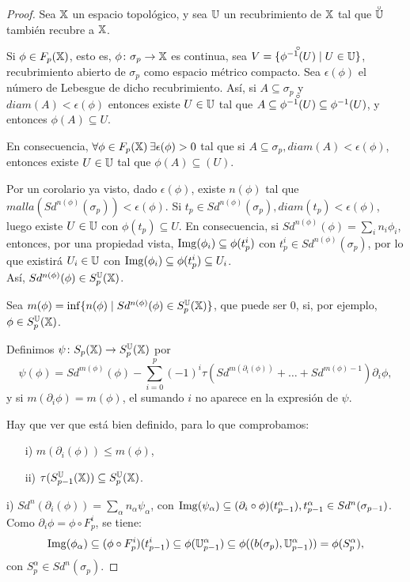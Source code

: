 \begin{proof}
  Sea ${\mathbb X}$ un espacio topológico, y sea ${\mathbb U}$ un recubrimiento de ${\mathbb X}$ tal que $\interior{\U}$ también recubre a ${\mathbb X}$.

  Si $\phi \in F_p({\mathbb X})$, esto es, $\phi \colon \sigma_p \to {\mathbb X}$ es continua, sea $V = \{\interior{\phi^{-1}(U)} \mid U \in \U\}$, recubrimiento
  abierto de $\sigma_p$ como espacio métrico compacto. Sea $\epsilon(\phi)$ el número de Lebesgue de dicho recubrimiento.
  Así, si $A \subseteq \sigma_p$ y $diam(A) < \epsilon(\phi)$ entonces existe $U \in {\mathbb U}$ tal que $A \subseteq \interior{\phi^{-1}(U)} \subseteq
  \phi^{-1}(U)$, y entonces $\phi(A) \subseteq U$.

  En consecuencia, $\forall \phi \in F_p({\mathbb X}) \hspace{0.2em} \exists \epsilon(\phi) > 0$ tal que si $A \subseteq \sigma_p, diam(A) < \epsilon(\phi)$,
  entonces existe $U \in {\mathbb U}$ tal que $\phi(A) \subseteq(U)$.

  Por un corolario ya visto, dado $\epsilon(\phi)$, existe $n(\phi)$ tal que ${malla(Sd^{n(\phi)}(\sigma_p)) < \epsilon(\phi)}$.
  Si $t_p \in Sd^{n(\phi)}(\sigma_p), diam(t_p) < \epsilon(\phi)$, luego existe $U \in {\mathbb U}$ con $\phi(t_p) \subseteq U$.
  En consecuencia, si $Sd^{n(\phi)}(\phi) = \sum_i n_i \phi_i$,  entonces, por una propiedad vista, $\operatorname{Img}(\phi_i) \subseteq \phi(t_p^i)$
  con $t_p^i \in Sd^{n(\phi)}(\sigma_p)$, por lo que existirá $U_i \in {\mathbb U}$ con $\operatorname{Img}(\phi_i) \subseteq \phi(t_p^i) \subseteq U_i$. \\
  Así, $Sd^{n(\phi)}(\phi) \in S_p^{\mathbb U}({\mathbb X})$.

  Sea $m(\phi) = \inf\{n(\phi) \mid Sd^{n(\phi)}(\phi) \in S_p^{\mathbb U}({\mathbb X})\}$, que puede ser $0$, si, por ejemplo, $\phi \in S_p^{\mathbb U}({\mathbb X})$.

  Definimos $\psi \colon S_p({\mathbb X}) \to S_p^{\mathbb U}({\mathbb X})$ por
  \[\psi(\phi) = Sd^{m(\phi)}(\phi) - \sum\limits_{i = 0}^p (-1)^i \tau(Sd^{m(\partial_i(\phi))} + \dots + Sd^{m(\phi) - 1}) \partial_i \phi, \]
  y si $m(\partial_i \phi) = m (\phi)$, el sumando $i$ no aparece en la expresión de $\psi$.

  Hay que ver que está bien definido, para lo que comprobamos:
  \begin{itemize}
    \item[i)] $m(\partial_i(\phi)) \leq m(\phi)$,
    \item[ii)] $\tau(S_{p-1}^{\mathbb U}({\mathbb X})) \subseteq S_p^{\mathbb U}({\mathbb X})$.
  \end{itemize}

  i) $Sd^n(\partial_i(\phi)) = \sum_\alpha n_\alpha \psi_\alpha$, con $\operatorname{Img}(\psi_\alpha) \subseteq (\partial_i \circ \phi)(t_{p-1}^\alpha), t_{p-1}^\alpha \in Sd^n(\sigma_{p-1})$. \\
  Como $\partial_i \phi = \phi \circ F_p^i$, se tiene:
  \[ \operatorname{Img}(\phi_\alpha) \subseteq (\phi \circ F_p^i)(t_{p-1}^i) \subseteq \phi({\mathbb U}_{p-1}^\alpha) \subseteq \phi((b(\sigma_p), {\mathbb U}_ {p-1}^\alpha)) = \phi(S_p^\alpha),\]
  con $S_p^\alpha \in Sd^n(\sigma_p)$.


\end{proof}
